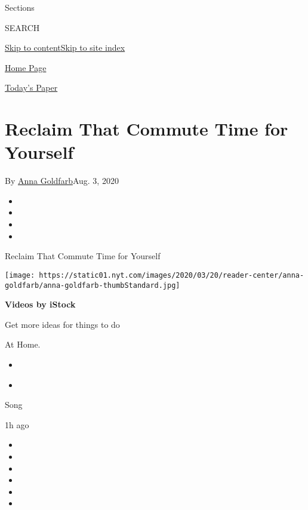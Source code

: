 Sections

SEARCH

\protect\hyperlink{site-content}{Skip to
content}\protect\hyperlink{site-index}{Skip to site index}

\href{https://www.nytimes.com//}{Home Page}

\href{https://myaccount.nytimes.com/auth/login?response_type=cookie\&client_id=vi}{}

\href{https://www.nytimes.com/section/todayspaper}{Today's Paper}

\hypertarget{reclaim-that-commute-time-for-yourself}{%
\section{Reclaim That Commute Time for
Yourself}\label{reclaim-that-commute-time-for-yourself}}

By \href{https://www.nytimes.com/by/anna-goldfarb}{Anna Goldfarb}Aug. 3,
2020

\begin{itemize}
\item
\item
\item
\item
\end{itemize}

Reclaim That Commute Time for Yourself

\texttt{[image: https://static01.nyt.com/images/2020/03/20/reader-center/anna-goldfarb/anna-goldfarb-thumbStandard.jpg]}

\textbf{Videos by iStock}

Get more ideas for things to do

\href{https://www.nytimes.com/spotlight/at-home}{}

At Home.

\begin{itemize}
\tightlist
\item
  \href{https://www.nytimes.com/2020/07/30/theater/theater-classes-at-home.html}{}
\item
  \href{https://www.nytimes.com/2020/07/30/arts/music/phoebe-bridgers-kyoto.html}{}
\end{itemize}

Song

1h ago

\begin{itemize}
\item
\item
\item
\item
\item
\item
\end{itemize}

